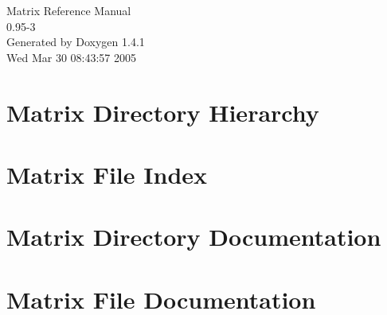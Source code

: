 \documentclass[letterpaper]{article}
\begin{document}
\begin{titlepage}
\vspace*{7cm}
\begin{center}
{\Large Matrix Reference Manual\\[1ex]\large 0.95-3 }\\
\vspace*{1cm}
{\large Generated by Doxygen 1.4.1}\\
\vspace*{0.5cm}
{\small Wed Mar 30 08:43:57 2005}\\
\end{center}
\end{titlepage}
\tableofcontents
{}
\section{Matrix Directory Hierarchy}

\section{Matrix File Index}

\section{Matrix Directory Documentation}

\section{Matrix File Documentation}




















































\printindex
\end{document}
